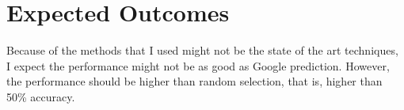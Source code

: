 \documentclass{article}
\begin{document}
\section*{Expected Outcomes}
Because of the methods that I used might not be the state of the art techniques, I expect the performance might not be as good as Google prediction.
However, the performance should be higher than random selection, that is, higher than 50\% accuracy.




\end{document}
